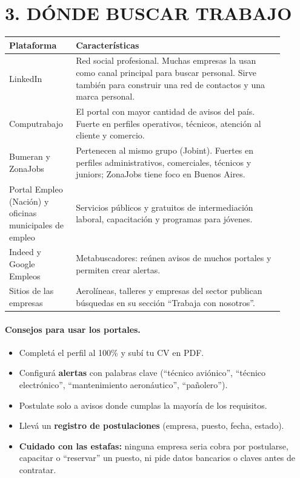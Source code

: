 \section*{3. DÓNDE BUSCAR TRABAJO}

\begin{center}
\small
\begin{tabular}{|p{0.20\linewidth}|p{0.70\linewidth}|}
\hline
\textbf{Plataforma} & \textbf{Características} \\ \hline
LinkedIn & Red social profesional. Muchas empresas la usan como canal principal para
buscar personal. Sirve también para construir una red de contactos y una marca personal. \\ \hline
Computrabajo & El portal con mayor cantidad de avisos del país. Fuerte en perfiles
operativos, técnicos, atención al cliente y comercio. \\ \hline
Bumeran y ZonaJobs & Pertenecen al mismo grupo (Jobint). Fuertes en perfiles
administrativos, comerciales, técnicos y juniors; ZonaJobs tiene foco en Buenos Aires. \\ \hline
Portal Empleo (Nación) y oficinas municipales de empleo & Servicios públicos y gratuitos de
intermediación laboral, capacitación y programas para jóvenes. \\ \hline
Indeed y Google Empleos & Metabuscadores: reúnen avisos de muchos portales y permiten crear
alertas. \\ \hline
Sitios de las empresas & Aerolíneas, talleres y empresas del sector publican búsquedas en su
sección ``Trabaja con nosotros''. \\ \hline
\end{tabular}
\end{center}

\paragraph*{Consejos para usar los portales.}
\begin{itemize}
  \item Completá el perfil al 100\% y subí tu CV en PDF.
  \item Configurá \textbf{alertas} con palabras clave (``técnico aviónico'', ``técnico
        electrónico'', ``mantenimiento aeronáutico'', ``pañolero'').
  \item Postulate solo a avisos donde cumplas la mayoría de los requisitos.
  \item Llevá un \textbf{registro de postulaciones} (empresa, puesto, fecha, estado).
  \item \textbf{Cuidado con las estafas:} ninguna empresa seria cobra por postularse,
        capacitar o ``reservar'' un puesto, ni pide datos bancarios o claves antes de
        contratar.
\end{itemize}

